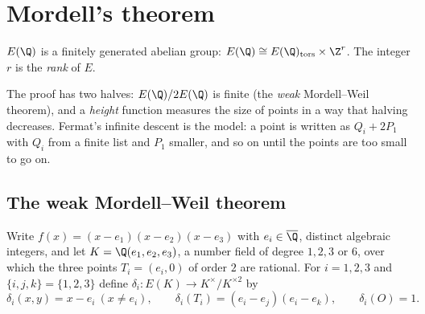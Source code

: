 \section{Mordell's theorem}

\begin{theorem}[Mordell, 1922]\label{thm:mordell}
$E(\Q)$ is a finitely generated abelian group: $E(\Q)\cong E(\Q)_{\mathrm{tors}}\times\Z^r$. The integer $r$ is the \emph{rank} of $E$.
\end{theorem}

The proof has two halves: $E(\Q)/2E(\Q)$ is finite (the \emph{weak} Mordell--Weil theorem), and a \emph{height} function measures the size of
points in a way that halving decreases. Fermat's infinite descent is the model: a point is written as $Q_i+2P_1$ with $Q_i$ from a finite list and
$P_1$ smaller, and so on until the points are too small to go on.

\subsection*{The weak Mordell--Weil theorem}

Write $f(x)=(x-e_1)(x-e_2)(x-e_3)$ with $e_i\in\overline{\Q}$, distinct algebraic integers, and let $K=\Q(e_1,e_2,e_3)$, a number field of degree $1,2,3$ or $6$,
over which the three points $T_i=(e_i,0)$ of order $2$ are rational. For $i=1,2,3$ and $\{i,j,k\}=\{1,2,3\}$ define
$\delta_i:E(K)\to K^\times/K^{\times2}$ by
\[
\delta_i(x,y)=x-e_i\ (x\ne e_i),\qquad\delta_i(T_i)=(e_i-e_j)(e_i-e_k),\qquad\delta_i(O)=1.
\]

